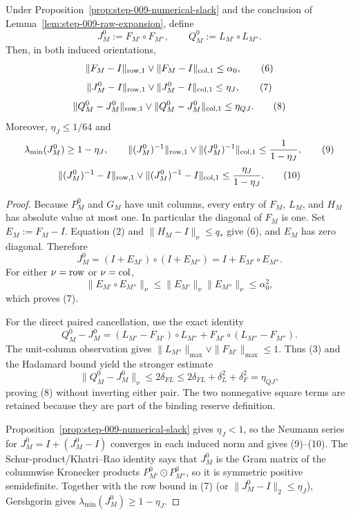 \begin{proposition}\label{prop:step-009-pair-reserves}
Under Proposition~\ref{prop:step-009-numerical-slack}
and the conclusion of Lemma~\ref{lem:step-009-raw-expansion}, define
\[
J_M^0:=F_{M'}\circ F_{M''},\qquad
Q_M^0:=L_{M'}\circ L_{M''}.
\]
Then, in both induced orientations,
\[
\|F_M-I\|_{\rm row,1}\vee\|F_M-I\|_{\rm col,1}\le\alpha_0, \tag{6}
\]
\[
\|J_M^0-I\|_{\rm row,1}\vee\|J_M^0-I\|_{\rm col,1}\le\eta_J, \tag{7}
\]
\[
\|Q_M^0-J_M^0\|_{\rm row,1}\vee\|Q_M^0-J_M^0\|_{\rm col,1}
\le\eta_{QJ}. \tag{8}
\]
Moreover, \(\eta_J\le1/64\) and
\[
\lambda_{\min}(J_M^0)\ge1-\eta_J,\qquad
\|(J_M^0)^{-1}\|_{\rm row,1}\vee\|(J_M^0)^{-1}\|_{\rm col,1}
\le\frac1{1-\eta_J}, \tag{9}
\]
\[
\|(J_M^0)^{-1}-I\|_{\rm row,1}\vee\|(J_M^0)^{-1}-I\|_{\rm col,1}
\le\frac{\eta_J}{1-\eta_J}. \tag{10}
\]

\begin{proof}

Because \(P_M^0\) and \(G_M\) have unit columns, every entry of \(F_M\),
\(L_M\), and \(H_M\) has absolute value at most one. In particular the
diagonal of \(F_M\) is one. Set \(E_M:=F_M-I\). Equation (2) and
\(\|H_M-I\|_\nu\le q_*\) give (6), and \(E_M\) has zero diagonal. Therefore
\[
J_M^0=(I+E_{M'})\circ(I+E_{M''})
  =I+E_{M'}\circ E_{M''}. \tag{11}
\]
For either \(\nu={\rm row}\) or \(\nu={\rm col}\),
\[
\|E_{M'}\circ E_{M''}\|_\nu
\le\|E_{M'}\|_\nu\|E_{M''}\|_\nu
\le\alpha_0^2,
\]
which proves (7).

For the direct paired cancellation, use the exact identity
\[
Q_M^0-J_M^0
 =(L_{M'}-F_{M'})\circ L_{M''}
  +F_{M'}\circ(L_{M''}-F_{M''}). \tag{12}
\]
The unit-column observation gives
\(\|L_{M''}\|_{\max}\vee\|F_{M'}\|_{\max}\le1\). Thus (3) and the
Hadamard bound yield the stronger estimate
\[
\|Q_M^0-J_M^0\|_\nu\le2\delta_{FL}
\le2\delta_{FL}+\delta_L^2+\delta_F^2=\eta_{QJ},
\]
proving (8) without inverting either pair. The two nonnegative square terms
are retained because they are part of the binding reserve definition.

Proposition~\ref{prop:step-009-numerical-slack} gives \(\eta_J<1\), so the
Neumann series for \(J_M^0=I+(J_M^0-I)\) converges in each induced norm and
gives (9)--(10).
The Schur-product/Khatri--Rao identity says that \(J_M^0\) is the Gram
matrix of the columnwise Kronecker products
\(P_{M'}^0\odot P_{M''}^0\), so it is symmetric positive semidefinite.
Together with the row bound in (7) (or
\(\|J_M^0-I\|_2\le\eta_J\)), Gershgorin gives
\(\lambda_{\min}(J_M^0)\ge1-\eta_J\). 


\end{proof}
\end{proposition}
